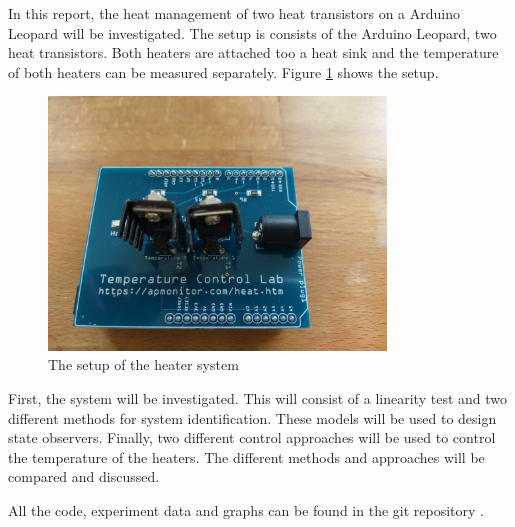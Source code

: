 In this report, the heat management of two heat transistors on a Arduino Leopard will be investigated. The setup is \cite{APMonitor} consists of the Arduino Leopard, two heat transistors. Both heaters are attached too a heat sink and  the temperature of both heaters can be measured separately. Figure \ref{fig:setup} shows the setup.
\begin{figure}[h]
    \centering
    \includegraphics[width = 0.8\textwidth]{Latex/images/Introduction/Setup.jpeg}
    \caption{The setup of the heater system}
    \label{fig:setup}
\end{figure}
First, the system will be investigated. This will consist of a linearity test and two different methods for system identification. These models will be used to design state observers. Finally, two different control approaches will be used to control the temperature of the heaters. The different methods and approaches will be compared and discussed.

All the code, experiment data and graphs can be found in the git repository \cite{IntegrationProject}.